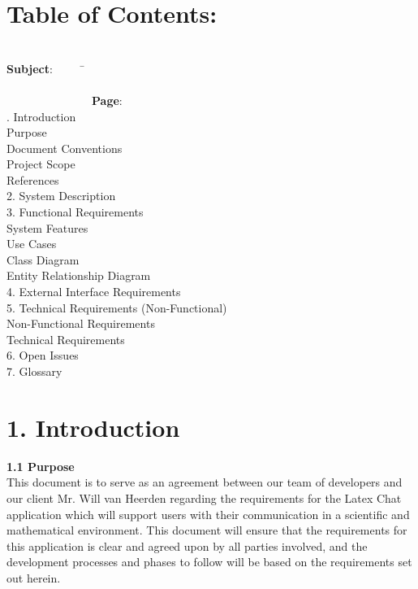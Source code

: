 \documentclass[29pt,a4paper]{moderncv}
\begin{document}
\section{\textbf{Table of Contents:}}
\begin{tabbing}
\\\textbf{Subject}: ~~~~~\= ~~~~~~~~~~~~~~~~~~~~~~~~~~~~~~~~~~~~~~~~~~~~~~~~~~~~~~~~~~~~~~~~~~~~~~~~~~~~~~~~~~~~~~~\= \textbf{Page}:
\\. Introduction \> \\							
 Purpose 	\\							
 Document Conventions 					\\
 Project Scope 							\\
 References 							\\
2. System Description \> 					\\
3. Functional Requirements \> \\				
 System Features \\
 Use Cases \\
 Class Diagram \\
 Entity Relationship Diagram \\
4. External Interface Requirements \> \\
5. Technical Requirements (Non-Functional) \> \\
 Non-Functional Requirements \\
 Technical Requirements \\
6. Open Issues \> 			\\				
7. Glossary \>  			\\				

\end{tabbing}
\newpage
	\section*{\textbf{1. Introduction}}
	\vspace{4mm}
	
		\textbf{1.1 Purpose}
			\\This document is to serve as an agreement between our team of developers and our client Mr. Will van Heerden regarding the requirements for the Latex Chat application which will support users with their communication in a scientific and mathematical environment.  This document will ensure that the requirements for this application is clear and agreed upon by all parties involved, and the development processes and phases to follow will be based on the requirements set out herein.\\
		\vspace{1mm}
		
\end{document}

